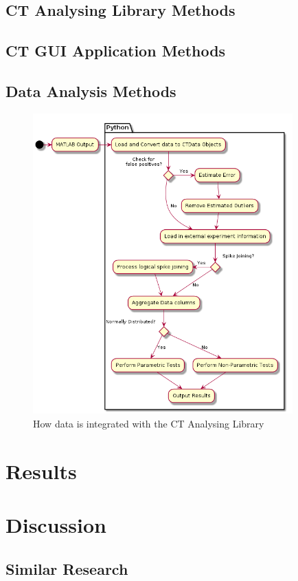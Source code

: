 \documentclass[11pt]{report}
\begin{document}
\section{CT Analysing Library Methods}
\label{sec-3-3}
\section{CT GUI Application Methods}
\label{sec-3-4}
\section{Data Analysis Methods}
\label{sec-3-5}
\begin{center}
\begin{figure}[htb]
\centering
\includegraphics[width=10cm]{./images/pipeline.png}
\caption{\label{fig:pipeline}How data is integrated with the CT Analysing Library}
\end{figure}
\end{center}

\chapter{Results}
\label{sec-4}
\chapter{Discussion}
\label{sec-5}
\section{Similar Research}
\label{sec-5-1}
\end{document}
